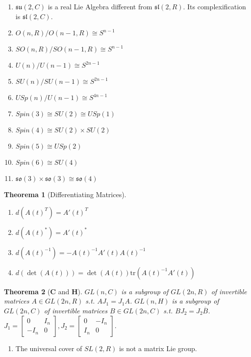\documentclass[12pt, a4paper]{article}
\newtheorem{theorem}{Theorema}[section]
\theoremstyle{definition}
\theoremstyle{remark}
\renewcommand{\sl}{\mathfrak{sl}}
\newcommand{\mf}[1]{\mathfrak{#1}}
\begin{document}
\begin{enumerate}
	\item $\mf{su}(2, C)$ is a real Lie Algebra different from $\sl(2, R)$. Its complexification is $\mf{sl}(2, C)$.
	\item $O(n, R)/O(n-1, R) \cong S^{n-1}$
	\item $SO(n, R)/SO(n-1, R) \cong S^{n-1}$
	\item $U(n)/U(n-1) \cong S^{2n-1}$
	\item $SU(n)/SU(n-1) \cong S^{2n-1}$
	\item $USp(n)/U(n-1) \cong S^{4n-1}$
	\item $Spin(3) \cong SU(2) \cong USp(1)$
	\item $Spin(4) \cong SU(2) \times SU(2)$
	\item $Spin(5) \cong USp(2)$
	\item $Spin(6) \cong SU(4)$
	\item $\mf{so}(3) \times \mf{so}(3) \cong \mf{so}(4)$
\end{enumerate}

\begin{theorem}[Differentiating Matrices]
	\ 
	\begin{enumerate} 
		\item $d(A(t)^T) = A'(t)^T$
		\item $d(A(t)^*) = A'(t)^*$
		\item $d(A(t)^{-1}) = -A(t)^{-1}A'(t)A(t)^{-1}$
		\item $d(\det(A(t))) = \det(A(t))\text{tr}(A(t)^{-1}A'(t))$
	
	\end{enumerate}
\end{theorem}

\begin{theorem}[$\bm{C}$ and $\bm{H}$]
	$GL(n,C)$ is a subgroup of $GL(2n, R)$ of invertible matrices $A \in GL(2n, R)$ s.t. $AJ_1 = J_1A$. 
	$GL(n, H)$ is a subgroup of $GL(2n, C)$ of invertible matrices $B \in GL(2n, C)$ s.t. $BJ_2 = J_2\overline{B}$.
	$
		J_1 = \begin{bmatrix}
			0 & I_n \\
			-I_n & 0
		\end{bmatrix}
		,
		J_2 = \begin{bmatrix}
			0 & -I_n \\
			I_n & 0
		\end{bmatrix}.
		$
\end{theorem}

\begin{enumerate}
	\item The universal cover of $SL(2,R)$ is not a matrix Lie group.
\end{enumerate}
\end{document}
